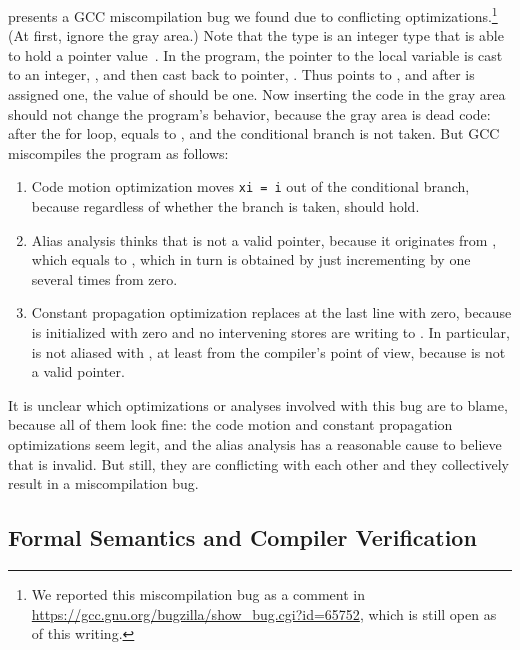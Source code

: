 presents a GCC miscompilation bug we found due to conflicting
optimizations.\footnote{We reported this miscompilation bug as a comment in
  \url{https://gcc.gnu.org/bugzilla/show_bug.cgi?id=65752}, which is still open as of this writing.}
(At first, ignore the gray area.)  Note that the type  is an integer type that is
able to hold a pointer value~\cite[\S7.20.1.4]{c18}.  In the program, the pointer to the local
variable  is cast to an integer, , and then cast back to pointer, .  Thus
 points to , and after  is assigned one, the value of  should be
one.  Now inserting the code in the gray area should not change the program's behavior, because the
gray area is dead code: after the for loop,  equals to , and the conditional branch
is not taken.  But GCC miscompiles the program as follows:
%
\begin{enumerate}
\item Code motion optimization moves \texttt{xi = i} out of the conditional branch, because
  regardless of whether the branch is taken,  should hold.
\item Alias analysis thinks that  is not a valid pointer, because it originates from
  , which equals to , which in turn is obtained by just incrementing by one several
  times from zero.
\item Constant propagation optimization replaces  at the last line with zero, because
   is initialized with zero and no intervening stores are writing to .  In
  particular,  is not aliased with , at least from the compiler's point of view,
  because  is not a valid pointer.
\end{enumerate}

\noindent It is unclear which optimizations or analyses involved with this bug are to blame, because
all of them look fine: the code motion and constant propagation optimizations seem legit, and the
alias analysis has a reasonable cause to believe that  is invalid.  But still, they are
conflicting with each other and they collectively result in a miscompilation bug.



\subsection{Formal Semantics and Compiler Verification}

